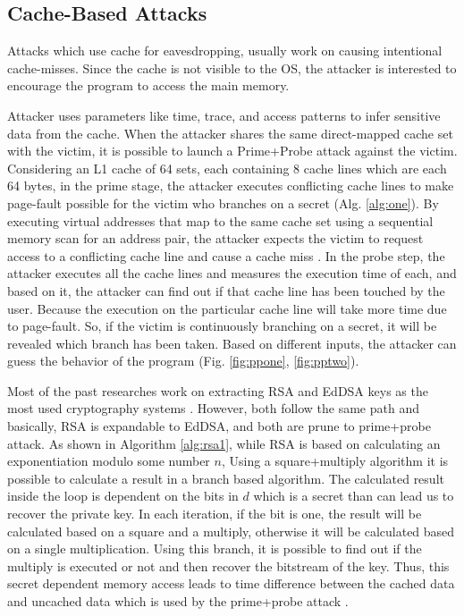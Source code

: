 \subsection{Cache-Based Attacks}
Attacks which use cache for eavesdropping, usually work on causing intentional cache-misses. Since the cache is not visible to the OS, the attacker is interested to encourage the program to access the main memory.

Attacker uses parameters like time, trace, and access patterns to infer sensitive data from the cache. When the attacker shares the same direct-mapped cache set with the victim, it is possible to launch a Prime+Probe attack against the victim. Considering an L1 cache of 64 sets, each containing 8 cache lines which are each 64 bytes, in the prime stage, the attacker executes conflicting cache lines to make page-fault possible for the victim who branches on a secret (Alg. \ref{alg:one}). By executing virtual addresses that map to the same cache set using a sequential memory scan for an address pair, the attacker expects the victim to request access to a conflicting cache line and cause a cache miss \cite{mge}. In the probe step, the attacker executes all the cache lines and measures the execution time of each, and based on it, the attacker can find out if that cache line has been touched by the user. Because the execution on the particular cache line will take more time due to page-fault. So, if the victim is continuously branching on a secret, it will be revealed which branch has been taken. Based on different inputs, the attacker can guess the behavior of the program \cite{primeprobe1,primeprobe2,cloak} (Fig. \ref{fig:ppone}, \ref{fig:pptwo}).

Most of the past researches work on extracting RSA and EdDSA keys as the most used cryptography systems \cite{mge,leakycauldron,brasser2017software, pigeonhole,cloak,stealthy}. However, both follow the same path and basically, RSA is expandable to EdDSA, and both are prune to prime+probe attack. As shown in Algorithm \ref{alg:rsa1}, while RSA is based on calculating an exponentiation modulo some number $n$, Using a square+multiply algorithm it is possible to calculate a result in a branch based algorithm. The calculated result inside the loop is dependent on the bits in $d$ which is a secret than can lead us to recover the private key. In each iteration, if the bit is one, the result will be calculated based on a square and a multiply, otherwise it will be calculated based on a single multiplication. Using this branch, it is possible to find out if the multiply is executed or not and then recover the bitstream of the key. Thus, this secret dependent memory access leads to time difference between the cached data and uncached data which is used by the prime+probe attack \cite{mge,cloak}.

